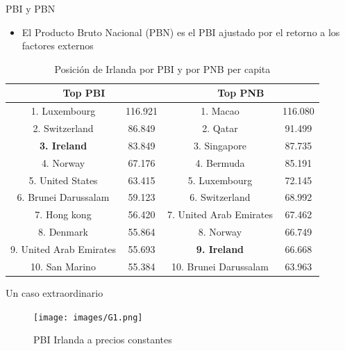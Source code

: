 \documentclass{beamer}
\begin{document}
\begin{frame}{PBI y PBN}
    \begin{itemize}
        \item El Producto Bruto Nacional (PBN) es el PBI ajustado por el retorno a los factores externos
    \end{itemize}
    \begin{table}[H]
\begin{tabular}{|c|c|c|c|}
\hline
\multicolumn{2}{|c|}{\textbf{Top PBI}} & \multicolumn{2}{c|}{\textbf{Top PNB}} \\ \hline
1. Luxembourg              & 116.921   & 1.  Macao                  & 116.080  \\ \hline
2.  Switzerland            & 86.849    & 2. Qatar                   & 91.499   \\ \hline
\textbf{3. Ireland}        & 83.849    & 3.  Singapore              & 87.735   \\ \hline
4. Norway                  & 67.176    & 4. Bermuda                 & 85.191   \\ \hline
5. United States           & 63.415    & 5. Luxembourg              & 72.145   \\ \hline
6. Brunei Darussalam       & 59.123    & 6. Switzerland             & 68.992   \\ \hline
7. Hong kong               & 56.420    & 7.  United Arab Emirates   & 67.462   \\ \hline
8. Denmark                 & 55.864    & 8. Norway                  & 66.749   \\ \hline
9. United Arab Emirates    & 55.693    & \textbf{9. Ireland}        & 66.668   \\ \hline
10. San Marino             & 55.384    & 10. Brunei Darussalam      & 63.963   \\ \hline
\end{tabular}
\caption{Posición de Irlanda por PBI y por PNB per capita}
\label{Tab:T38.1}
\end{table}
\end{frame}



\begin{frame}{Un caso extraordinario }
    
\begin{figure} [H]
\centering
\texttt{[image: images/G1.png]}
\caption{PBI Irlanda a precios constantes}
\label{fig:G1}
\end{figure} 
\end{frame}
\end{document}
